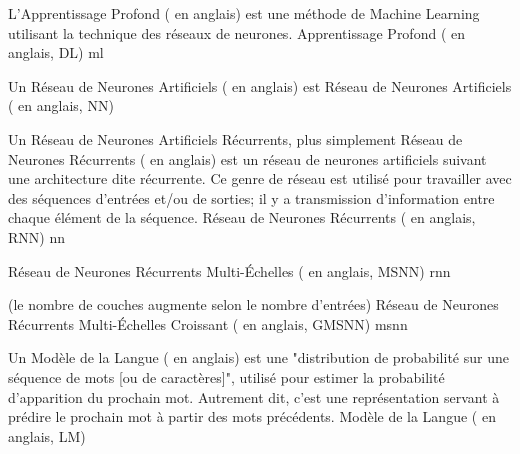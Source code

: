 {%
	L'Apprentissage Profond ( en anglais) est 
	une méthode de Machine Learning utilisant la technique des réseaux de 
	neurones. %
}{Apprentissage Profond ( en anglais, DL)}
{ml}

{%
	Un Réseau de Neurones Artificiels ( en 
	anglais) est %
}{Réseau de Neurones Artificiels ( en anglais, NN)}

{%
	Un Réseau de Neurones Artificiels Récurrents, plus 
	simplement Réseau de Neurones Récurrents ( en anglais) est un réseau de neurones artificiels suivant une 
	architecture dite récurrente.
	\newline
	Ce genre de réseau est utilisé pour travailler avec des séquences d'entrées 
	et/ou de sorties; il y a transmission d'information entre chaque élément de 
	la séquence. \cite{wikirnn}
}{Réseau de Neurones Récurrents ( en anglais, RNN)}
{nn}

{%
}{Réseau de Neurones Récurrents Multi-Échelles ( en anglais, MSNN)}
{rnn}

{%
	(le nombre de couches augmente selon le nombre d'entrées)
}{Réseau de Neurones Récurrents Multi-Échelles Croissant ( en anglais, GMSNN)}
{msnn}


{%
	Un Modèle de la Langue ( en anglais) est une "distribution de probabilité sur une séquence de mots [ou de caractères]", 
	utilisé pour estimer la probabilité d'apparition du prochain mot.
	Autrement dit, c'est une représentation servant à prédire le prochain mot à partir des mots précédents. \cite{wikilm}
}{Modèle de la Langue ( en anglais, LM)}

